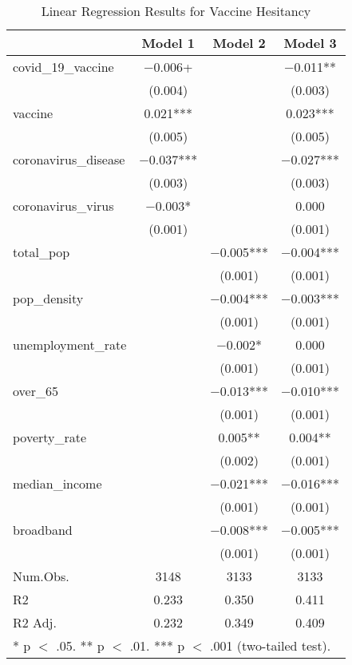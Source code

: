 \begin{table}[!h]

\caption{\label{tab:vacc_hes_analysis}Linear Regression Results for Vaccine Hesitancy}
\centering
\fontsize{8}{10}\selectfont

\begin{tabular}{lccc}
\toprule
  & Model 1 & Model 2 & Model 3\\
\midrule

covid\_19\_vaccine & \num{-0.006}+ &  & \num{-0.011}**\\
 & (\num{0.004}) &  & (\num{0.003})\\
vaccine & \num{0.021}*** &  & \num{0.023}***\\
 & (\num{0.005}) &  & (\num{0.005})\\
coronavirus\_disease & \num{-0.037}*** &  & \num{-0.027}***\\
 & (\num{0.003}) &  & (\num{0.003})\\
coronavirus\_virus & \num{-0.003}* &  & \num{0.000}\\
 & (\num{0.001}) &  & (\num{0.001})\\
total\_pop &  & \num{-0.005}*** & \num{-0.004}***\\
 &  & (\num{0.001}) & \vphantom{5} (\num{0.001})\\
pop\_density &  & \num{-0.004}*** & \num{-0.003}***\\
 &  & (\num{0.001}) & \vphantom{4} (\num{0.001})\\
unemployment\_rate &  & \num{-0.002}* & \num{0.000}\\
 &  & (\num{0.001}) & \vphantom{3} (\num{0.001})\\
over\_65 &  & \num{-0.013}*** & \num{-0.010}***\\
 &  & (\num{0.001}) & \vphantom{2} (\num{0.001})\\
poverty\_rate &  & \num{0.005}** & \num{0.004}**\\
 &  & (\num{0.002}) & (\num{0.001})\\
median\_income &  & \num{-0.021}*** & \num{-0.016}***\\
 &  & (\num{0.001}) & \vphantom{1} (\num{0.001})\\
broadband &  & \num{-0.008}*** & \num{-0.005}***\\
 &  & (\num{0.001}) & (\num{0.001})\\
\midrule
Num.Obs. & \num{3148} & \num{3133} & \num{3133}\\
R2 & \num{0.233} & \num{0.350} & \num{0.411}\\
R2 Adj. & \num{0.232} & \num{0.349} & \num{0.409}\\
\bottomrule
\multicolumn{4}{l}{\rule{0pt}{1em}* p $<$ .05. ** p $<$ .01. *** p $<$ .001 (two-tailed test).}\\
\end{tabular}
\end{table}
